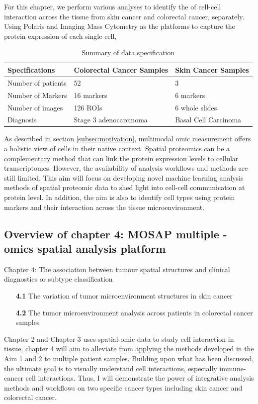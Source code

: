 For this chapter, we perform various analyses to identify the of cell-cell interaction across the tissue from skin cancer and colorectal cancer, separately. Using Polaris and Imaging Mass Cytometry as the platforms to capture the protein expression of each single cell,  

\begin{table}[ht]
\centering
\caption{Summary of data specification}
\begin{tabular}{||P{7cm} || P{3cm} || P{3cm} ||} 
 \hline
 Specifications & Colorectal Cancer Samples & Skin Cancer Samples   \\ [0.33ex] 
 \hline\hline
 Number of patients & 52 & 3   \\ 
 \hline
 Number of Markers & 16 markers & 6 markers  \\ 
 \hline
 Number of images & 126 ROIs &  6 whole slides \\
 \hline
 Diagnosis & Stage 3 adenocarcinoma & Basal Cell Carcinoma  \\ [1ex] 
 \hline
\end{tabular}
\label{table:DataInfor}
\end{table}

As described in section \ref{subsec:motivation}, multimodal omic measurement offers a holistic view of cells in their native context. Spatial proteomics can be a complementary method that can link the protein expression levels to cellular transcriptomes. However, the availability of analysis workflows and methods are still limited. This aim will focus on developing novel machine learning analysis methods of spatial proteomic data to shed light into cell-cell communication at protein level. In addition, the aim is also to identify cell types using protein markers and their interaction across the tissue microenvironment.             


\subsection{Overview of chapter 4: MOSAP multiple -omics spatial analysis platform}


Chapter 4: The association between tumour spatial structures and clinical diagnostics or subtype classification
\begin{enumerate}[align=left]
    \item[\textbf{4.1}] The variation of tumor microenvironment structures in skin cancer
    \item[\textbf{4.2}] The tumor microenvironment analysis across patients in colorectal cancer samples
\end{enumerate}
Chapter 2 and Chapter 3 uses spatial-omic data to study cell interaction in tissue, chapter 4 will aim to alleviate from applying the methods developed in the Aim 1 and 2 to multiple patient samples. Building upon what has been discussed, the ultimate goal is to visually understand cell interactions, especially immune-cancer cell interactions. Thus, I will demonstrate the power of integrative analysis methods and workflows on two specific cancer types including skin cancer and colorectal cancer.

